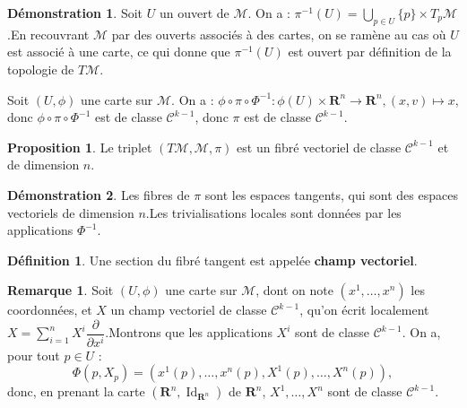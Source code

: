 \documentclass[12pt,a4paper]{article}
\DeclareMathOperator{\Id}{Id}
\theoremstyle{definition}
\newtheorem{prop}[thm]{Proposition}
\newtheorem{defn}[thm]{Définition}
\newtheorem{rqe}[thm]{Remarque}
\newtheorem*{dem}{Démonstration}
\begin{document}
\begin{dem}
Soit $U$ un ouvert de $\mathcal{M}$. On a : $\displaystyle\pi^{-1}(U)=\bigcup_{p\in U}\{p\}\times T_p\mathcal{M}$.\newline En recouvrant $\mathcal{M}$ par des ouverts associés à des cartes, on se ramène au cas où $U$ est associé à une carte, ce qui donne que $\pi^{-1}(U)$ est ouvert par définition de la topologie de $T\mathcal{M}$.

\medskip

Soit $(U,\phi)$ une carte sur $\mathcal{M}$.\newline
On a : $\phi\circ\pi\circ\Phi^{-1}:\phi(U)\times\mathbf{R}^n\to\mathbf{R}^n,(x,v)\mapsto x$, donc $\phi\circ\pi\circ\Phi^{-1}$ est de classe $\mathcal{C}^{k-1}$, donc $\pi$ est de classe $\mathcal{C}^{k-1}$.
\end{dem}
\newpage
\begin{prop}
Le triplet $(T\mathcal{M},\mathcal{M},\pi)$ est un fibré vectoriel de classe $\mathcal{C}^{k-1}$ et de dimension $n$.
\end{prop}
\begin{dem}
Les fibres de $\pi$ sont les espaces tangents, qui sont des espaces vectoriels de dimension $n$.\newline Les trivialisations locales sont données par les applications $\Phi^{-1}$.
\end{dem}
\begin{defn}
Une section du fibré tangent est appelée \textbf{champ vectoriel}.
\end{defn}
\begin{rqe}
Soit $(U,\phi)$ une carte sur $\mathcal{M}$, dont on note $(x^1,\ldots,x^n)$ les coordonnées, et $X$ un champ vectoriel de classe $\mathcal{C}^{k-1}$, qu'on écrit localement $\displaystyle X=\sum\limits_{i=1}^nX^i\dfrac{\partial}{\partial x^i}$.\newline Montrons que les applications $X^i$ sont de classe $\mathcal{C}^{k-1}$. On a, pour tout $p\in U$ :
$$
\Phi(p,X_p)=\left(x^1(p),\ldots,x^n(p),X^1(p),\ldots,X^n(p)\right)
,$$
donc, en prenant la carte $(\mathbf{R}^n,\Id_{\mathbf{R}^n})$ de $\mathbf{R}^n$, $X^1,\ldots,X^n$ sont de classe $\mathcal{C}^{k-1}$.
\end{rqe}
\newpage
\end{document}
